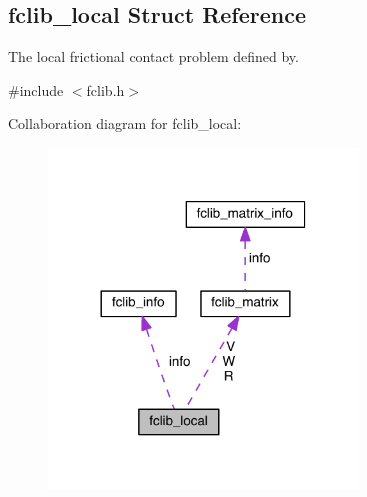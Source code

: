 \hypertarget{structfclib__local}{}\subsection{fclib\+\_\+local Struct Reference}
\label{structfclib__local}


The local frictional contact problem defined by.  




{\ttfamily \#include $<$fclib.\+h$>$}



Collaboration diagram for fclib\+\_\+local\+:\nopagebreak
\begin{figure}[H]
\begin{center}
\leavevmode
\includegraphics[width=233pt]{structfclib__local__coll__graph}
\end{center}
\end{figure}
